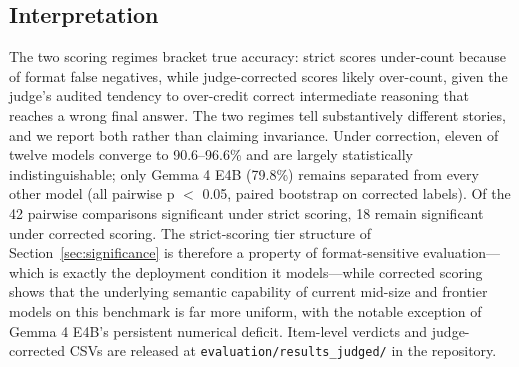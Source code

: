 \documentclass[11pt]{article}
\begin{document}
\subsection{Interpretation}

The two scoring regimes bracket true accuracy: strict scores under-count because of format false negatives, while judge-corrected scores likely over-count, given the judge's audited tendency to over-credit correct intermediate reasoning that reaches a wrong final answer. The two regimes tell substantively different stories, and we report both rather than claiming invariance. Under correction, eleven of twelve models converge to 90.6--96.6\% and are largely statistically indistinguishable; only Gemma 4 E4B (79.8\%) remains separated from every other model (all pairwise p $<$ 0.05, paired bootstrap on corrected labels). Of the 42 pairwise comparisons significant under strict scoring, 18 remain significant under corrected scoring. The strict-scoring tier structure of Section~\ref{sec:significance} is therefore a property of format-sensitive evaluation---which is exactly the deployment condition it models---while corrected scoring shows that the underlying semantic capability of current mid-size and frontier models on this benchmark is far more uniform, with the notable exception of Gemma 4 E4B's persistent numerical deficit. Item-level verdicts and judge-corrected CSVs are released at \texttt{evaluation/results\_judged/} in the repository.
\end{document}
